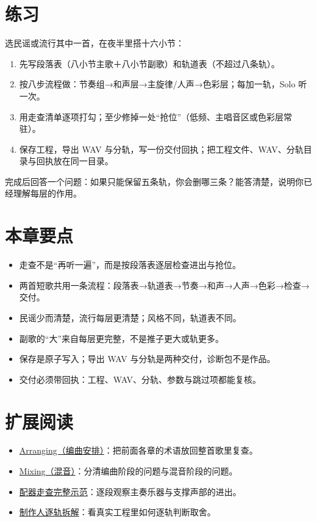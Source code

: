 \section{练习}
\label{sec:walkthrough-exercise}

\begin{exercise}
选民谣或流行其中一首，在夜半里搭十六小节：
\begin{enumerate}
\item 先写段落表（八小节主歌＋八小节副歌）和轨道表（不超过八条轨）。
\item 按八步流程做：节奏组→和声层→主旋律/人声→色彩层；每加一轨，Solo 听一次。
\item 用走查清单逐项打勾；至少修掉一处“抢位”（低频、主唱音区或色彩层常驻）。
\item 保存工程，导出 WAV 与分轨，写一份交付回执；把工程文件、WAV、分轨目录与回执放在同一目录。
\end{enumerate}
完成后回答一个问题：如果只能保留五条轨，你会删哪三条？能答清楚，说明你已经理解每层的作用。
\end{exercise}

\section{本章要点}
\label{sec:walkthrough-takeaways}

\begin{itemize}
\item 走查不是“再听一遍”，而是按段落表逐层检查进出与抢位。
\item 两首短歌共用一条流程：段落表→轨道表→节奏→和声→人声→色彩→检查→交付。
\item 民谣少而清楚，流行每层更清楚；风格不同，轨道表不同。
\item 副歌的“大”来自每层更完整，不是推子更大或轨更多。
\item 保存是原子写入；导出 WAV 与分轨是两种交付，诊断包不是作品。
\item 交付必须带回执：工程、WAV、分轨、参数与跳过项都能复核。
\end{itemize}

\section{扩展阅读}
\label{sec:10-walkthrough-further-reading}
\begin{itemize}
  \item \href{https://en.wikipedia.org/wiki/Arranging}{Arranging（编曲安排）}：把前面各章的术语放回整首歌里复查。
  \item \href{https://en.wikipedia.org/wiki/Mixing_(music)}{Mixing（混音）}：分清编曲阶段的问题与混音阶段的问题。
  \item \href{https://www.youtube.com/watch?v=Mf6ZKAV0ZU4}{配器走查完整示范}：逐段观察主奏乐器与支撑声部的进出。
  \item \href{https://www.youtube.com/watch?v=KS89XfqFE9A}{制作人逐轨拆解}：看真实工程里如何逐轨判断取舍。
\end{itemize}

